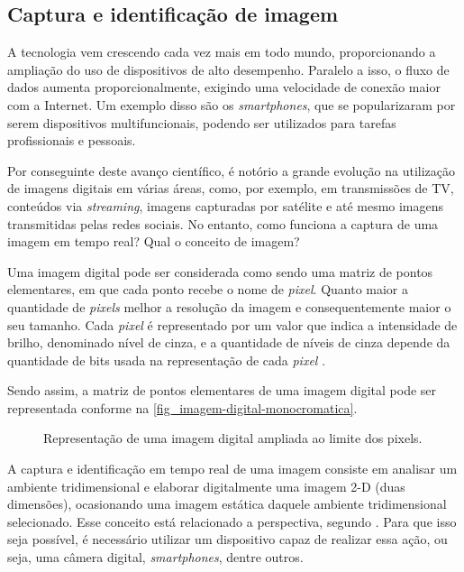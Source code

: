 \subsection{Captura e identificação de imagem}

A tecnologia vem crescendo cada vez mais em todo mundo, proporcionando a ampliação do uso de dispositivos de alto desempenho. Paralelo a isso, o fluxo de dados aumenta proporcionalmente, exigindo uma velocidade de conexão maior com a Internet. Um exemplo disso são os \textit{smartphones}, que se popularizaram por serem dispositivos multifuncionais, podendo ser utilizados para tarefas profissionais e pessoais. 

Por conseguinte deste avanço científico, é notório a grande evolução na utilização de imagens digitais em várias áreas, como, por exemplo, em transmissões de TV, conteúdos via \textit{streaming}, imagens capturadas por satélite e até mesmo imagens transmitidas pelas redes sociais. No entanto, como funciona a captura de uma imagem em tempo real? Qual o conceito de imagem?

Uma imagem digital pode ser considerada como sendo uma matriz de pontos elementares, em que cada ponto recebe o nome de \textit{pixel}. Quanto maior a quantidade de \textit{pixels} melhor a resolução da imagem e consequentemente maior o seu tamanho. Cada \textit{pixel} é representado por um valor que indica a intensidade de brilho, denominado nível de cinza, e a quantidade de níveis de cinza depende da quantidade de bits usada na representação de cada \textit{pixel} \cite{SOUZA2007}.

Sendo assim, a matriz de pontos elementares de uma imagem digital pode ser representada conforme na \autoref{fig_imagem-digital-monocromatica}.

\begin{figure}[h]
	\caption{\label{fig_imagem-digital-monocromatica}Representação de uma imagem digital ampliada ao limite dos pixels.}
	\begin{center}
	\end{center}
	\centering {}
\end{figure}

A captura e identificação em tempo real de uma imagem consiste em analisar um ambiente tridimensional e elaborar digitalmente uma imagem 2-D (duas dimensões), ocasionando uma imagem estática daquele ambiente tridimensional selecionado. Esse conceito está relacionado a perspectiva, segundo . Para que isso seja possível, é necessário utilizar um dispositivo capaz de realizar essa ação, ou seja, uma câmera digital, \textit{smartphones}, dentre outros.

